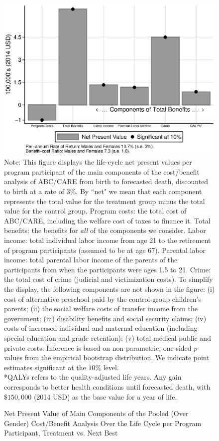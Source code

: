 \begin{figure}
\caption{Net Present Value of Main Components of the Pooled (Over Gender) Cost/Benefit Analysis Over the Life Cycle per Program Participant, Treatment vs. Next Best}\label{figure:main}
\centering
\includegraphics[width=.7\columnwidth]{output/abccare_npvssummredux.eps}
\footnotesize \justify
Note: This figure displays the life-cycle net present values per program participant of the main components of the cost/benefit analysis of ABC/CARE from birth to forecasted death, discounted to birth at a rate of 3\%. By ``net" we mean that each component represents the total value for the treatment group minus the total value for the control group. Program costs: the total cost of ABC/CARE, including the welfare cost of taxes to finance it. Total benefits: the benefits for \textit{all} of the components we consider. Labor income: total individual labor income from age 21 to the retirement of program participants (assumed to be at age 67). Parental labor income: total parental labor income of the parents of the participants from when the participants were ages 1.5 to 21. Crime: the total cost of crime (judicial and victimization costs). To simplify the display, the following components are not shown in the figure: (i) cost of alternative preschool paid by the control-group children's parents; (ii) the social welfare costs of transfer income from the government; (iii) disability benefits and social security claims; (iv) costs of increased individual and maternal education (including special education and grade retention); (v) total medical public and private costs. Inference is based on non-parametric, one-sided $p$-values from the empirical bootstrap distribution. We indicate point estimates significant at the $10\%$ level.\\
*QALYs refers to the quality-adjusted life years. Any gain corresponds to better health conditions until forecasted death, with $\$150,000$ (2014 USD) as the base value for a year of life.
\end{figure}

